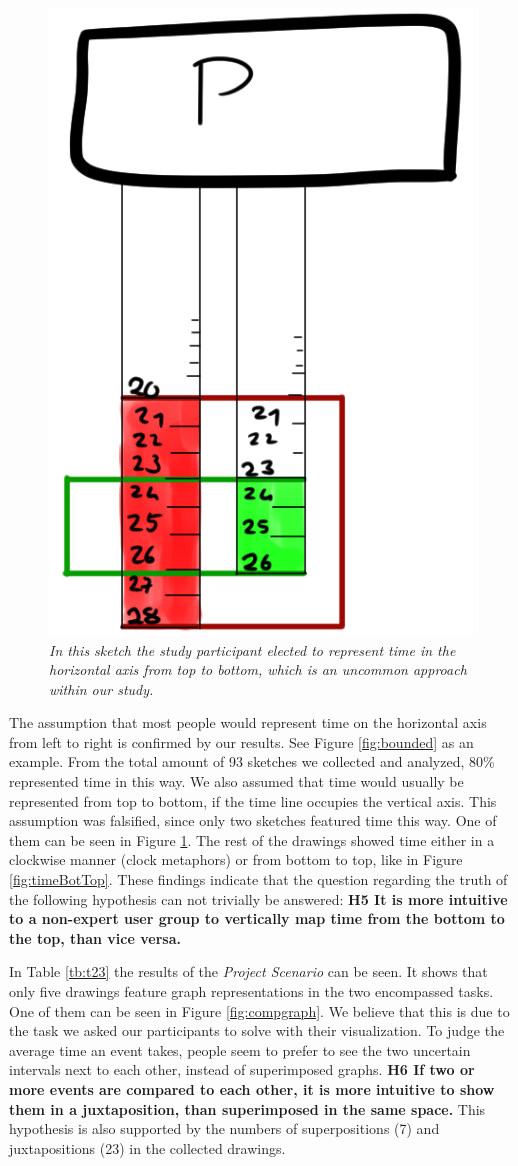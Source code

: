 \begin{figure}[H]
	\centering
	\captionsetup{width=0.8\textwidth}
	\includegraphics[height=0.45\textwidth]{figures/topbot.png}
	\caption{\textit{In this sketch the study participant elected to represent time in the horizontal axis from top to bottom, which is an uncommon approach within our study.}}
	\label{fig:topbot}
\end{figure}

The assumption that most people would represent time on the horizontal axis from left to right is confirmed by our results. See Figure \ref{fig:bounded} as an example. From the total amount of 93 sketches we collected and analyzed, 80\% represented time in this way. We also assumed that time would usually be represented from top to bottom, if the time line occupies the vertical axis. This assumption was falsified, since only two sketches featured time this way. One of them can be seen in Figure \ref{fig:topbot}. The rest of the drawings showed time either in a clockwise manner (clock metaphors) or from bottom to top, like in Figure \ref{fig:timeBotTop}. These findings indicate that the question regarding the truth of the following hypothesis can not trivially be answered: \textbf{H5 It is more intuitive to a non-expert user group to vertically map time from the bottom to the top, than vice versa.}\par \medskip

In Table \ref{tb:t23} the results of the \textit{Project Scenario} can be seen. It shows that only five drawings feature graph representations in the two encompassed tasks. One of them can be seen in Figure \ref{fig:compgraph}. We believe that this is due to the task we asked our participants to solve with their visualization. To judge the average time an event takes, people seem to prefer to see the two uncertain intervals next to each other, instead of superimposed graphs. \textbf{H6 If two or more events are compared to each other, it is more intuitive to show them in a juxtaposition, than superimposed in the same space.} This hypothesis is also supported by the numbers of superpositions (7) and juxtapositions (23) in the collected drawings. \par \medskip

